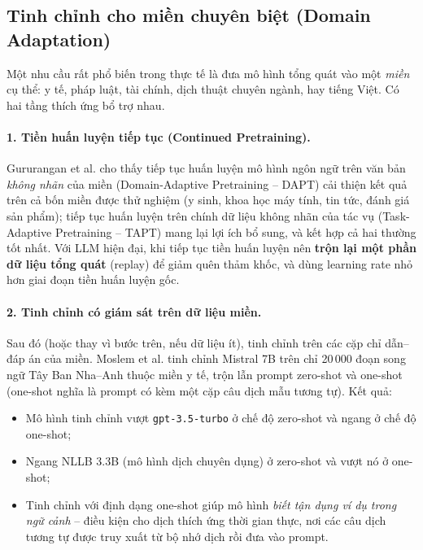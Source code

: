 \subsection{Tinh chỉnh cho miền chuyên biệt (Domain Adaptation)}
\label{ssec:domain_adaptation}
Một nhu cầu rất phổ biến trong thực tế là đưa mô hình tổng quát vào một \emph{miền} cụ thể: y tế, pháp luật, tài chính, dịch thuật chuyên ngành, hay tiếng Việt. Có hai tầng thích ứng bổ trợ nhau.

\paragraph{1. Tiền huấn luyện tiếp tục (Continued Pretraining).} Gururangan et al. \cite{gururangan2020dontstop} cho thấy tiếp tục huấn luyện mô hình ngôn ngữ trên văn bản \emph{không nhãn} của miền (Domain-Adaptive Pretraining -- DAPT) cải thiện kết quả trên cả bốn miền được thử nghiệm (y sinh, khoa học máy tính, tin tức, đánh giá sản phẩm); tiếp tục huấn luyện trên chính dữ liệu không nhãn của tác vụ (Task-Adaptive Pretraining -- TAPT) mang lại lợi ích bổ sung, và kết hợp cả hai thường tốt nhất. Với LLM hiện đại, khi tiếp tục tiền huấn luyện nên \textbf{trộn lại một phần dữ liệu tổng quát} (replay) để giảm quên thảm khốc, và dùng learning rate nhỏ hơn giai đoạn tiền huấn luyện gốc.

\paragraph{2. Tinh chỉnh có giám sát trên dữ liệu miền.} Sau đó (hoặc thay vì bước trên, nếu dữ liệu ít), tinh chỉnh trên các cặp chỉ dẫn--đáp án của miền. Moslem et al. \cite{moslem2023adaptivemt} tinh chỉnh Mistral 7B trên chỉ 20\,000 đoạn song ngữ Tây Ban Nha--Anh thuộc miền y tế, trộn lẫn prompt zero-shot và one-shot (one-shot nghĩa là prompt có kèm một cặp câu dịch mẫu tương tự). Kết quả:
\begin{itemize}
	\item Mô hình tinh chỉnh vượt \texttt{gpt-3.5-turbo} ở chế độ zero-shot và ngang ở chế độ one-shot;
	\item Ngang NLLB 3.3B (mô hình dịch chuyên dụng) ở zero-shot và vượt nó ở one-shot;
	\item Tinh chỉnh với định dạng one-shot giúp mô hình \emph{biết tận dụng ví dụ trong ngữ cảnh} -- điều kiện cho dịch thích ứng thời gian thực, nơi các câu dịch tương tự được truy xuất từ bộ nhớ dịch rồi đưa vào prompt.
\end{itemize}


